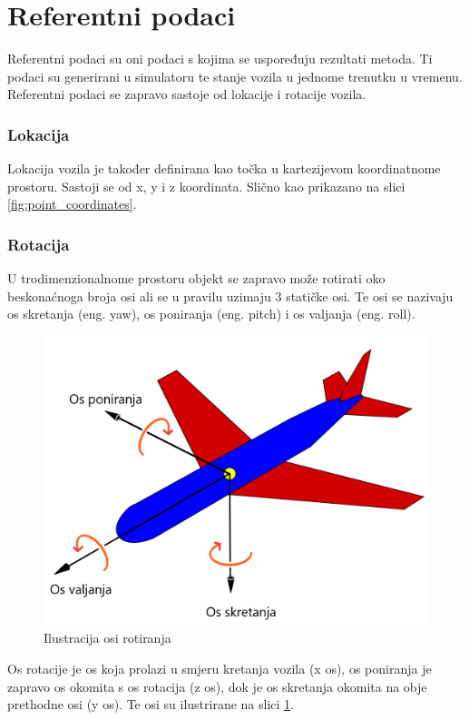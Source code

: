 \section{Referentni podaci}

Referentni podaci su oni podaci s kojima se uspoređuju rezultati metoda. Ti podaci su generirani u simulatoru te stanje vozila u jednome trenutku u vremenu. Referentni podaci se zapravo sastoje od lokacije i rotacije vozila.

\subsubsection{Lokacija}
Lokacija vozila je također definirana kao točka u kartezijevom koordinatnome prostoru. Sastoji se od x, y i z koordinata. Slično kao prikazano na slici \ref{fig:point_coordinates}.

\subsubsection{Rotacija}
 U trodimenzionalnome prostoru objekt se zapravo može rotirati oko beskonaćnoga broja osi ali se u pravilu uzimaju 3 statičke osi. Te osi se nazivaju os skretanja (eng. yaw), os poniranja (eng. pitch) i os valjanja (eng. roll). 

\begin{figure}[!ht]
  \centering
  \includegraphics[scale=0.3]{images/yaw_roll_pitch_example.png}
  \caption{Ilustracija osi rotiranja}
  \label{fig:yaw_roll_pitch_example}
\end{figure}

Os rotacije je os koja prolazi u smjeru kretanja vozila (x os), os poniranja je zapravo os okomita s os rotacija (z os), dok je os skretanja okomita na obje prethodne osi (y os). Te osi su ilustrirane na slici \ref{fig:yaw_roll_pitch_example}.

